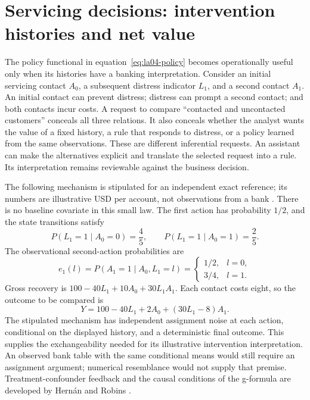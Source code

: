 \section{Servicing decisions: intervention histories and net value}
\label{exec14:l5-servicing}

The policy functional in equation~\eqref{eq:la04-policy} becomes operationally
useful only when its histories have a banking interpretation. Consider an
initial servicing contact $A_0$, a subsequent distress indicator $L_1$, and a
second contact $A_1$. An initial contact can prevent distress; distress can
prompt a second contact; and both contacts incur costs. A request to compare
``contacted and uncontacted customers'' conceals all three relations. It also
conceals whether the analyst wants the value of a fixed history, a rule that
responds to distress, or a policy learned from the same observations. These are
different inferential requests. An assistant can make the alternatives explicit
and translate the selected request into a rule. Its interpretation remains
reviewable against the business decision.

The following mechanism is stipulated for an independent exact reference; its
numbers are illustrative USD per account, not observations from a bank
\citep{exec14_workflow_oracle}. There is no baseline covariate in this small law.
The first action has probability $1/2$, and the state transitions satisfy
\[
 P(L_1=1\mid A_0=0)=\frac45,\qquad
 P(L_1=1\mid A_0=1)=\frac25.
\]
The observational second-action probabilities are
\[
 e_1(l)=P(A_1=1\mid A_0,L_1=l)
 =\begin{cases}1/2,&l=0,\\3/4,&l=1.\end{cases}
\]
Gross recovery is $100-40L_1+10A_0+30L_1A_1$. Each contact costs eight, so the
outcome to be compared is
\[
 Y=100-40L_1+2A_0+(30L_1-8)A_1.
 \label{eq:exec14-l5-net}
\]
The stipulated mechanism has independent assignment noise at each action,
conditional on the displayed history, and a deterministic final outcome.
This supplies the exchangeability needed for its illustrative intervention
interpretation. An observed bank table with the same conditional means would
still require an assignment argument; numerical resemblance would not supply
that premise. Treatment-confounder feedback and the causal conditions of the
g-formula are developed by Hern\'an and Robins \citep{hernan2020}.

